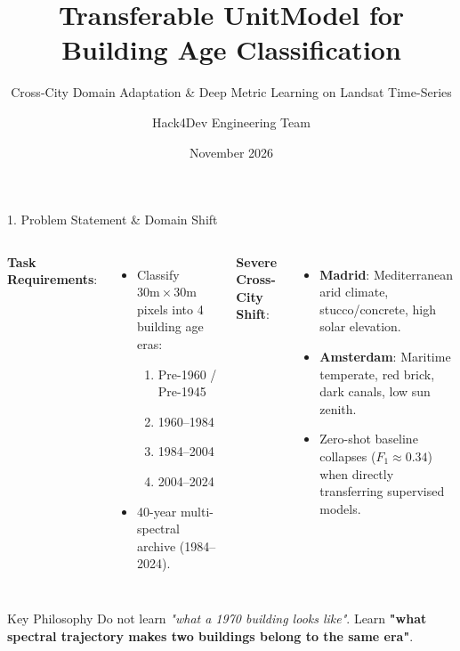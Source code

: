 \documentclass[aspectratio=169,10pt]{beamer}
\title[Transferable UnitModel]{Transferable UnitModel for Building Age Classification}
\subtitle{Cross-City Domain Adaptation \& Deep Metric Learning on Landsat Time-Series}
\author[Hack4Dev Team]{Hack4Dev Engineering Team}
\date{November 2026}
\begin{document}
\begin{frame}
  \titlepage
\end{frame}

\begin{frame}{1. Problem Statement \& Domain Shift}
  \begin{columns}[T]
    \textbf{Task Requirements}:
    \begin{itemize}
      \item Classify $30\text{m} \times 30\text{m}$ pixels into 4 building age eras:
      \begin{enumerate}
        \item Pre-1960 / Pre-1945
        \item 1960--1984
        \item 1984--2004
        \item 2004--2024
      \end{enumerate}
      \item 40-year multi-spectral archive (1984--2024).
    \end{itemize}

    \textbf{Severe Cross-City Shift}:
    \begin{itemize}
      \item \textbf{Madrid}: Mediterranean arid climate, stucco/concrete, high solar elevation.
      \item \textbf{Amsterdam}: Maritime temperate, red brick, dark canals, low sun zenith.
      \item \alert{Zero-shot baseline collapses} ($F_1 \approx 0.34$) when directly transferring supervised models.
    \end{itemize}
  \end{columns}

  \vspace{0.4cm}
  \begin{block}{Key Philosophy}
    Do not learn \textit{"what a 1970 building looks like"}. Learn \textbf{"what spectral trajectory makes two buildings belong to the same era"}.
  \end{block}
\end{frame}
\end{document}
